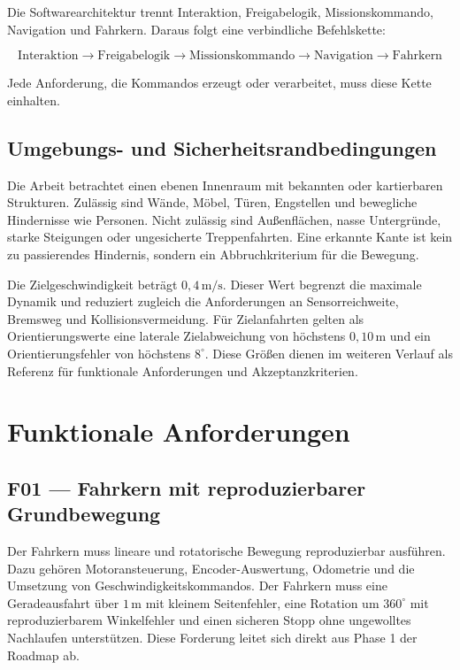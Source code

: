 Die Softwarearchitektur trennt Interaktion, Freigabelogik, Missionskommando, Navigation und Fahrkern. Daraus folgt eine verbindliche Befehlskette:

$$\text{Interaktion} \rightarrow \text{Freigabelogik} \rightarrow \text{Missionskommando} \rightarrow \text{Navigation} \rightarrow \text{Fahrkern}$$

Jede Anforderung, die Kommandos erzeugt oder verarbeitet, muss diese Kette einhalten.

\subsection{Umgebungs- und Sicherheitsrandbedingungen}

Die Arbeit betrachtet einen ebenen Innenraum mit bekannten oder kartierbaren Strukturen. Zulässig sind Wände, Möbel, Türen, Engstellen und bewegliche Hindernisse wie Personen. Nicht zulässig sind Außenflächen, nasse Untergründe, starke Steigungen oder ungesicherte Treppenfahrten. Eine erkannte Kante ist kein zu passierendes Hindernis, sondern ein Abbruchkriterium für die Bewegung.

Die Zielgeschwindigkeit beträgt $0{,}4\,\mathrm{m/s}$. Dieser Wert begrenzt die maximale Dynamik und reduziert zugleich die Anforderungen an Sensorreichweite, Bremsweg und Kollisionsvermeidung. Für Zielanfahrten gelten als Orientierungswerte eine laterale Zielabweichung von höchstens $0{,}10\,\mathrm{m}$ und ein Orientierungsfehler von höchstens $8^\circ$. Diese Größen dienen im weiteren Verlauf als Referenz für funktionale Anforderungen und Akzeptanzkriterien.

\section{Funktionale Anforderungen}

\subsection{F01 — Fahrkern mit reproduzierbarer Grundbewegung}

Der Fahrkern muss lineare und rotatorische Bewegung reproduzierbar ausführen. Dazu gehören Motoransteuerung, Encoder-Auswertung, Odometrie und die Umsetzung von Geschwindigkeitskommandos. Der Fahrkern muss eine Geradeausfahrt über $1\,\mathrm{m}$ mit kleinem Seitenfehler, eine Rotation um $360^\circ$ mit reproduzierbarem Winkelfehler und einen sicheren Stopp ohne ungewolltes Nachlaufen unterstützen. Diese Forderung leitet sich direkt aus Phase 1 der Roadmap ab.

